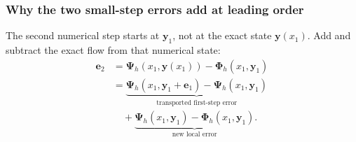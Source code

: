 \subsubsection{Why the two small-step errors add at leading order}
The second numerical step starts at $\mathbf y_1$, not at the exact state
$\mathbf y(x_1)$. Add and subtract the exact flow from that numerical state:
\begin{equation}\label{Eq:RichErrorSplit}
\begin{aligned}
 \mathbf e_2
 &=\boldsymbol\Psi_h(x_1,\mathbf y(x_1))
       -\boldsymbol\Phi_h(x_1,\mathbf y_1)\\
 &=\underbrace{\boldsymbol\Psi_h(x_1,\mathbf y_1+\mathbf e_1)
       -\boldsymbol\Psi_h(x_1,\mathbf y_1)}_{\text{transported first-step error}}\\
 &\quad+\underbrace{\boldsymbol\Psi_h(x_1,\mathbf y_1)
       -\boldsymbol\Phi_h(x_1,\mathbf y_1)}_{\text{new local error}}.
\end{aligned}
\end{equation}

